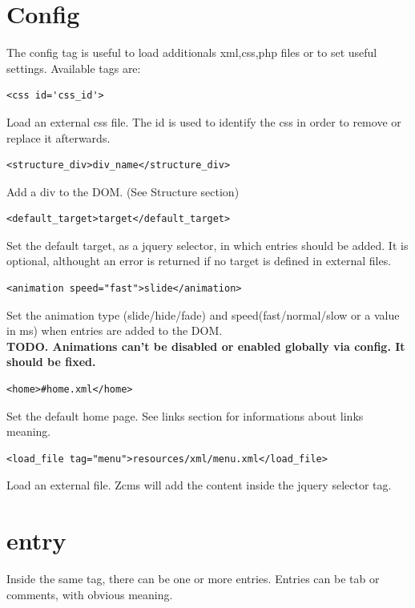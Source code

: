 \documentclass[a4paper,12pt]{article}
\begin{document}
\section{Config}
The config tag is useful to load additionals xml,css,php files or to set useful settings. Available tags are:
\begin{list}{-}{}
\item \begin{verbatim}
<css id='css_id'>       
      \end{verbatim}
Load an external css file. The id is used to identify the css in order to remove or replace it afterwards.
\item \begin{verbatim}
<structure_div>div_name</structure_div>       
      \end{verbatim}
Add a div to the DOM. (See Structure section)
\item \begin{verbatim}
<default_target>target</default_target>       
      \end{verbatim}
Set the default target, as a jquery selector, in which entries should be added. It is optional, althought an error is returned if no target is defined in external files.
\item \begin{verbatim}
<animation speed="fast">slide</animation>
      \end{verbatim}
Set the animation type (slide/hide/fade) and speed(fast/normal/slow or a value in ms) when entries are added to the DOM.\\
\bfseries{TODO}. \normalfont Animations can't be disabled or enabled globally via config. It should be fixed.
\item \begin{verbatim}
<home>#home.xml</home>
      \end{verbatim}
Set the default home page. See links section for informations about links meaning.
\item \begin{verbatim}
<load_file tag="menu">resources/xml/menu.xml</load_file>
      \end{verbatim}
Load an external file. Zcms will add the content inside the jquery selector tag.
\end{list}

\section{entry}
Inside the same tag, there can be one or more entries. Entries can be tab or comments, with obvious meaning.
\end{document}
